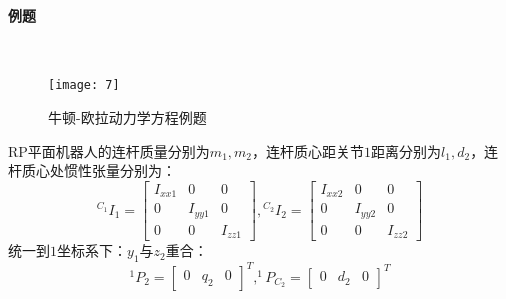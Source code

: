 \documentclass[
12pt, %
a4paper, 
oneside, %
headinclude,footinclude, %
]{scrartcl}
\begin{document}
\paragraph{例题}~\\
{\footnotesize
\begin{minipage}{0.35\textwidth}
\begin{figure}[H]
\centering 
\texttt{[image: 7]} 
\caption[牛顿-欧拉动力学方程例题]{牛顿-欧拉动力学方程例题}
\end{figure}
\end{minipage}
\hfill
\begin{minipage}{0.6\textwidth}
RP平面机器人的连杆质量分别为$ m_1,m_2 $，连杆质心距关节$ 1 $距离分别为$ l_1,d_2 $，连杆质心处惯性张量分别为：
$$
{^{C_1}}I_1 = \begin{bmatrix} I_{xx1} & 0 & 0 \\ 0 & I_{yy1} & 0 \\ 0 & 0 & I_{zz1} \end{bmatrix},
{^{C_2}}I_2 = \begin{bmatrix}  I_{xx2} & 0 & 0 \\ 0 & I_{yy2} & 0 \\ 0 & 0 & I_{zz2} \end{bmatrix}
$$
统一到$ 1 $坐标系下：$ y_1 $与$ z_2 $重合：
$$ ^1P_2 = \begin{bmatrix} 0 & q_2 & 0 \end{bmatrix}^T, ^1P_{C_2} = \begin{bmatrix} 0 & d_2 & 0 \end{bmatrix}^T $$
\end{minipage}

}
\end{document}
